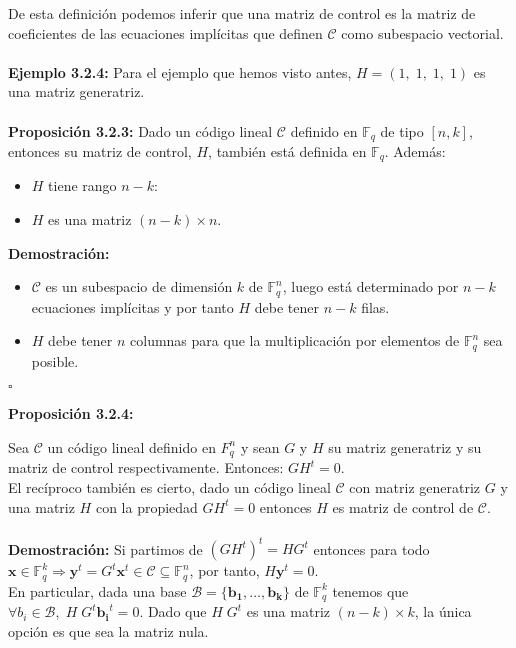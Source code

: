 \documentclass[11pt,spanish]{book}
\newcommand{\qed}{\begin{flushright} $\square$ \end{flushright}}
\begin{document}
De esta definición podemos inferir que una matriz de control es la matriz de coeficientes de las ecuaciones implícitas que definen $\mathcal{C}$ como subespacio vectorial.\\
\\ \textbf{Ejemplo 3.2.4: } Para el ejemplo que hemos visto antes, $H=(1,\;1,\;1,\;1)$ es una matriz generatriz. \\
\\ \textbf{Proposición 3.2.3: } Dado un código lineal $\mathcal{C}$ definido en $\mathbb{F}_{q}$ de tipo $[n,k]$, entonces su matriz de control, $H$, también está definida en $\mathbb{F}_{q}$. Además:
\begin{itemize}
    \item $H$ tiene rango $n-k$:
    \item $H$ es una matriz $(n-k)\times n$.
\end{itemize}
\textbf{Demostración: }
\begin{itemize}
    \item $\mathcal{C}$ es un subespacio de dimensión $k$ de $\mathbb{F}_{q}^{n}$, luego está determinado por $n-k$ ecuaciones implícitas y por tanto $H$ debe tener $n-k$ filas.
    \item $H$ debe tener $n$ columnas para que la multiplicación por elementos de $\mathbb{F}_{q}^{n}$ sea posible.
\end{itemize}
\qed
\hypertarget{prop3.2.4}{\textbf{Proposición 3.2.4: }} Sea $\mathcal{C}$ un código lineal definido en $F_{q}^{n}$ y sean $G$ y $H$ su matriz generatriz y su matriz de control respectivamente. Entonces: $GH^{t} = 0.$\\
El recíproco también es cierto, dado un código lineal $\mathcal{C}$ con matriz generatriz $G$ y una matriz $H$ con la propiedad $GH^t=0$ entonces $H$ es matriz de control de $\mathcal{C}$.\\
\\ \textbf{Demostración: }
Si partimos de $(GH^{t})^{t} = HG^{t}$ entonces para todo $\mathbf{x}\in \mathbb{F}_{q}^{k}\Rightarrow \mathbf{y}^{t}=G^{t} \mathbf{x}^{t}\in \mathcal{C}\subseteq \mathbb{F}_{q}^{n}$, por tanto, $H \mathbf{y}^{t}=0$.\\ 

En particular, dada una base $\mathcal{B}=\{\mathbf{b_1},\ldots ,\mathbf{b_k}\}$ de $\mathbb{F}_{q}^{k}$ tenemos que $\forall b_{i}\in\mathcal{B},\; H\;G^{t} \mathbf{b_{i}}^{t}=0$. Dado que $H\;G^{t}$ es una matriz $(n-k)\times k$, la única opción es que sea la matriz nula.\\
\end{document}
